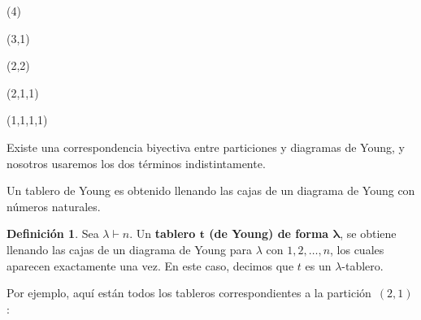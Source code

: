 \documentclass[12pt]{book}
\theoremstyle{definition}
\newtheorem{definition}[theorem]{Definición}
\newcounter{in}
\newcounter{ini}
\begin{document}
\begin{center}
  \begin{minipage}[h]{0.2\linewidth}
    \centering {}\bigskip

    (4)
  \end{minipage}
  \begin{minipage}[h]{0.15\linewidth}
    \centering {}\medskip

    (3,1)
  \end{minipage}
  \begin{minipage}[h]{0.15\linewidth}
    \centering {}\medskip

    (2,2)
  \end{minipage}
  \begin{minipage}[h]{0.15\linewidth}
    \centering {}\smallskip

    (2,1,1)
  \end{minipage}
  \begin{minipage}[h]{0.15\linewidth}
    \centering {}\smallskip

    (1,1,1,1)
  \end{minipage}
\end{center}

Existe una correspondencia biyectiva entre particiones y diagramas
de Young, y nosotros usaremos los dos términos indistintamente.

Un tablero de Young es obtenido llenando las cajas de un diagrama de
Young con números naturales.

\begin{definition}
  Sea $\lambda\vdash n$. Un \textbf{tablero $\boldsymbol{t}$ (de Young) de forma
    $\boldsymbol{\lambda}$}, se obtiene llenando las cajas de un
  diagrama de Young para $\lambda$ con $1,2,\ldots,n$, los cuales
  aparecen exactamente una vez. En este caso, decimos que $t$ es un
  $\lambda$-tablero.
\end{definition}

Por ejemplo, aquí están todos los tableros correspondientes a la
partición~$(2,1)$:
\end{document}
